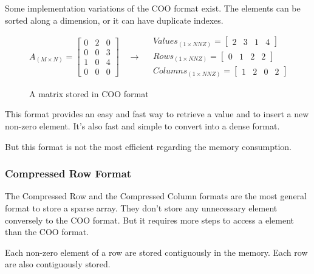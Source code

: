 Some implementation variations of the COO format exist. The elements can be sorted along a dimension, or it can have duplicate indexes.

\begin{figure}[h]
	\[
	A_{(M\times N)} = 
	\begin{bmatrix}
	0 &  2 & 0 \\
	0 &  0 & 3 \\
	1 &  0 & 4\\
	0 &  0 & 0
	\end{bmatrix}
	\quad\rightarrow\quad
	\begin{aligned}
	Values_{(1\times NNZ)} = 
	\begin{bmatrix}
	2 &  3 & 1 & 4
	\end{bmatrix}
	\\
	Rows_{(1\times NNZ)} = 
	\begin{bmatrix}
	0 &  1 & 2 & 2
	\end{bmatrix}
	\\
	Columns_{(1\times NNZ)} = 
	\begin{bmatrix}
	1 &  2 & 0 & 2
	\end{bmatrix}
	\end{aligned}
	\]
	\caption{A matrix stored in COO format}
	\label{fig:cooformat}
\end{figure}

This format provides an easy and fast way to retrieve a value and to insert a new non-zero element. It's also fast and simple to convert into a dense format.

But this format is not the most efficient regarding the memory consumption.

\subsubsection{Compressed Row Format}

The Compressed Row and the Compressed Column formats are the most general format to store a sparse array. They don't store any unnecessary element conversely to the COO format. But it requires more steps to access a element than the COO format. 

Each non-zero element of a row are stored contiguously in the memory. Each row are also contiguously stored.

